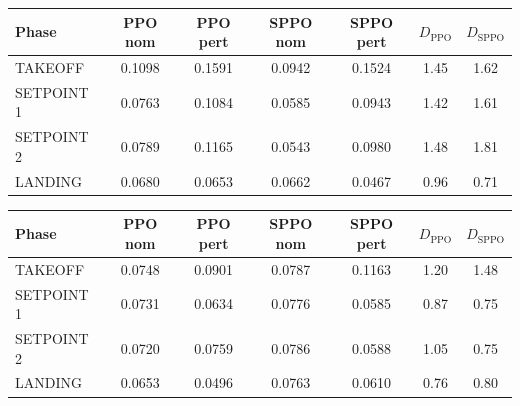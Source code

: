 
\begin{tabular}{lcccccc}
\toprule
Phase & PPO nom & PPO pert & SPPO nom & SPPO pert & $D_{\mathrm{PPO}}$ & $D_{\mathrm{SPPO}}$ \\
\midrule
TAKEOFF & 0.1098 & 0.1591 & 0.0942 & 0.1524 & 1.45 & 1.62 \\
SETPOINT 1 & 0.0763 & 0.1084 & 0.0585 & 0.0943 & 1.42 & 1.61 \\
SETPOINT 2 & 0.0789 & 0.1165 & 0.0543 & 0.0980 & 1.48 & 1.81 \\
LANDING & 0.0680 & 0.0653 & 0.0662 & 0.0467 & 0.96 & 0.71 \\
\bottomrule
\end{tabular}

\begin{tabular}{lcccccc}
\toprule
Phase & PPO nom & PPO pert & SPPO nom & SPPO pert & $D_{\mathrm{PPO}}$ & $D_{\mathrm{SPPO}}$ \\
\midrule
TAKEOFF & 0.0748 & 0.0901 & 0.0787 & 0.1163 & 1.20 & 1.48 \\
SETPOINT 1 & 0.0731 & 0.0634 & 0.0776 & 0.0585 & 0.87 & 0.75 \\
SETPOINT 2 & 0.0720 & 0.0759 & 0.0786 & 0.0588 & 1.05 & 0.75 \\
LANDING & 0.0653 & 0.0496 & 0.0763 & 0.0610 & 0.76 & 0.80 \\
\bottomrule
\end{tabular}
